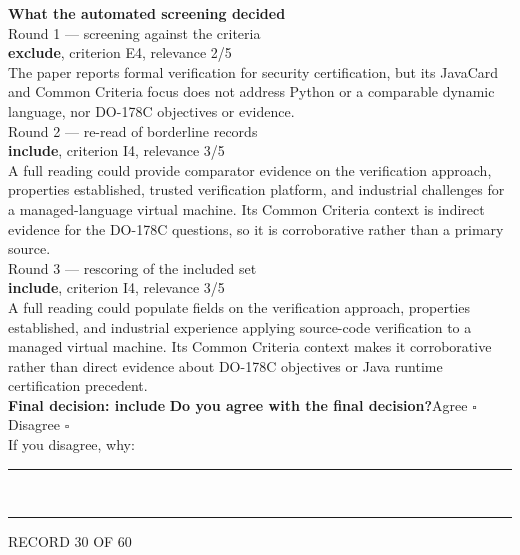 \documentclass[11pt,a4paper]{article}
\begin{document}
\vspace{3mm}
\vspace{2.5mm}
{\small\textbf{What the automated screening decided}}\\[2mm]
{\footnotesize\color{soft}Round 1 --- screening against the criteria}\\[0.5mm]
{\small\textbf{exclude}, criterion E4, relevance 2/5}\\[0.5mm]
{\small The paper reports formal verification for security certification, but its JavaCard and Common Criteria focus does not address Python or a comparable dynamic language, nor DO-178C objectives or evidence.}\\[2.5mm]
{\footnotesize\color{soft}Round 2 --- re-read of borderline records}\\[0.5mm]
{\small\textbf{include}, criterion I4, relevance 3/5}\\[0.5mm]
{\small A full reading could provide comparator evidence on the verification approach, properties established, trusted verification platform, and industrial challenges for a managed-language virtual machine. Its Common Criteria context is indirect evidence for the DO-178C questions, so it is corroborative rather than a primary source.}\\[2.5mm]
{\footnotesize\color{soft}Round 3 --- rescoring of the included set}\\[0.5mm]
{\small\textbf{include}, criterion I4, relevance 3/5}\\[0.5mm]
{\small A full reading could populate fields on the verification approach, properties established, and industrial experience applying source-code verification to a managed virtual machine. Its Common Criteria context makes it corroborative rather than direct evidence about DO-178C objectives or Java runtime certification precedent.}\\[2.5mm]
{\small\textbf{Final decision: include}}
\vspace{2mm}
{\small\textbf{Do you agree with the final decision?}\quad{}Agree $\square$\qquad{}Disagree $\square$}\\[1mm]
{\footnotesize\color{soft}If you disagree, why:}\\[1mm]
\color{rule}\rule{\linewidth}{0.3pt}\\[3mm]\rule{\linewidth}{0.3pt}\color{black}
\clearpage
{\color{soft}\footnotesize RECORD 30 OF 60}\\[1mm]
\end{document}
